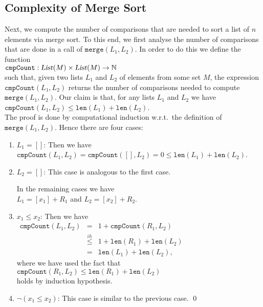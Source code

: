 \subsection{Complexity of Merge Sort}
Next, we compute the number of comparisons that are needed to sort a list of $n$
elements via merge sort.  To this end, we first analyse the number of comparisons that 
are done in a call of $\mathtt{merge}(L_1, L_2)$.   In order to do this we define the function \\[0.2cm]
\hspace*{1.3cm} 
$\mathtt{cmpCount}: \textsl{List}(M) \times \textsl{List}(M) \rightarrow \mathbb{N}$ 
\\[0.2cm]
such that, given two lists $L_1$ and $L_2$ of elements from some set $M$, the expression $\mathtt{cmpCount}(L_1, L_2)$ returns the
number of comparisons needed to compute $\mathtt{merge}(L_1,L_2)$. 
Our claim is that, for any lists $L_1$ and $L_2$ we have  
\\[0.2cm]
\hspace*{1.3cm}
$\mathtt{cmpCount}(L_1, L_2) \leq \mathtt{len}(L_1) + \mathtt{len}(L_2)$. 
\\[0.2cm]
The proof is done by computational induction w.r.t.~the definition of $\mathtt{merge}(L_1, L_2)$.  Hence there are four cases:
\begin{enumerate}
\item $L_1 = []$:  Then we have
      \\[0.2cm]
      \hspace*{1.3cm}
      $\mathtt{cmpCount}(L_1, L_2) = \mathtt{cmpCount}([], L_2) = 0 \leq  \mathtt{len}(L_1) + \mathtt{len}(L_2)$.
\item $L_2 = []$:  This case is analogous to the first case.

      In the remaining cases we have
      \\[0.2cm]
      \hspace*{1.3cm}
      $L_1 = [x_1] + R_1$ \quad and \quad   $L_2 = [x_2] + R_2$.
\item $x_1 \leq x_2$: Then we have
      \\[0.2cm]
      \hspace*{1.3cm}
      $\begin{array}{lcl}
       \mathtt{cmpCount}(L_1, L_2) & = & 1 + \mathtt{cmpCount}(R_1, L_2) \\[0.2cm]
                                  & \stackrel{ih}{\leq} & 1 + \mathtt{len}(R_1) + \mathtt{len}(L_2) \\[0.2cm]
                                 & = & \mathtt{len}(L_1) + \mathtt{len}(L_2),
       \end{array}
      $
      \\[0.2cm]
      where we have used the fact that
      \\[0.2cm]
      \hspace*{1.3cm}
      $\mathtt{cmpCount}(R_1, L_2) \leq \mathtt{len}(R_1) + \mathtt{len}(L_2)$
      \\[0.2cm]
      holds by induction hypothesis.
    \item $\neg (x_1 \leq x_2)$: This case is similar to the previous case. \qed
\end{enumerate}

